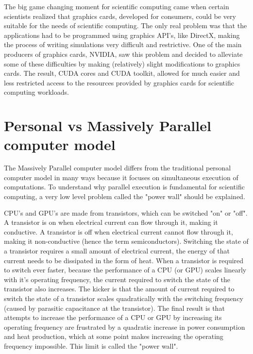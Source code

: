 The big game changing moment for scientific computing came when certain scientists realized that graphics cards, developed for consumers, could be very suitable for the needs of scientific computing. The only real problem was that the applications had to be programmed using graphics API's, like DirectX, making the process of writing simulations very difficult and restrictive. One of the main producers of graphics cards, NVIDIA, saw this problem and decided to alleviate some of these difficulties by making (relatively) slight modifications to graphics cards. The result, CUDA cores and CUDA toolkit, allowed for much easier and less restricted access to the resources provided by graphics cards for scientific computing workloads.

\newpage

\section{Personal vs Massively Parallel computer model}

\hspace{4mm}The Massively Parallel computer model differs from the traditional personal computer model in many ways because it focuses on simultaneous execution of computations\autocite[]{wiki_mp}. To understand why parallel execution is fundamental for scientific computing, a very low level problem called the "power wall" should be explained.\vspace{5mm}

CPU's and GPU's are made from transistors, which can be switched "on" or "off". A transistor is on when electrical current can flow through it, making it conductive. A transistor is off when electrical current cannot flow through it, making it non-conductive (hence the term semiconductors). Switching the state of a transistor requires a small amount of electrical current, the energy of that current needs to be dissipated in the form of heat. When a transistor is required to switch ever faster, because the performance of a CPU (or GPU) scales linearly with it's operating frequency, the current required to switch the state of the transistor also increases. The kicker is that the amount of current required to switch the state of a transistor scales quadratically with the switching frequency (caused by parasitic capacitance at the transistor). The final result is that attempts to increase the performance of a CPU or GPU by increasing its operating frequency are frustrated by a quadratic increase in power consumption and heat production, which at some point makes increasing the operating frequency impossible. This limit is called the "power wall".\vspace{5mm}


